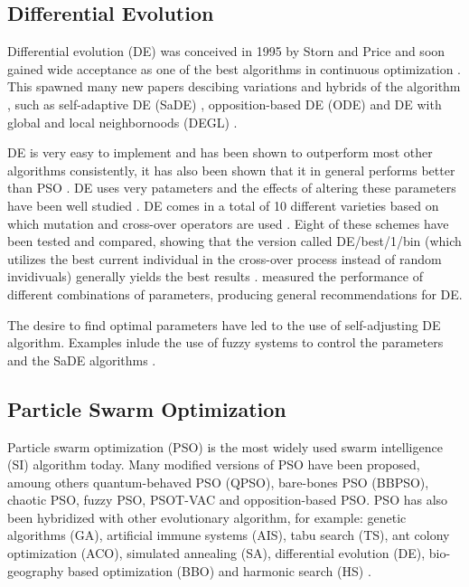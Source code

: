 \subsection{Differential Evolution}

Differential evolution (DE) was conceived in 1995 by Storn and Price \cite{storn1995differential} and soon gained wide acceptance as one of the best algorithms in continuous optimization \cite{price1997differential}. This spawned many new papers descibing variations and hybrids of the algorithm \cite{5601760}, such as self-adaptive DE (SaDE) \cite{qin2009differential}, opposition-based DE (ODE) \cite{rahnamayan2008opposition} and DE with global and local neighbornoods (DEGL) \cite{rahnamayan2008opposition}.

DE is very easy to implement and has been shown to outperform most other algorithms consistently, it has also been shown that it in general performs better than PSO \cite{das2009differential, vesterstrom2004comparative}. DE uses very patameters and the effects of altering these parameters have been well studied \cite{5601760}. DE comes in a total of 10 different varieties based on which mutation and cross-over operators are used \cite{price2006differential}. Eight of these schemes have been tested and compared, showing that the version called DE/best/1/bin (which utilizes the best current individual in the cross-over process instead of random invidivuals) generally yields the best results \cite{mezura2006comparative}. \cite{gamperle2002parameter} measured the performance of different combinations of parameters, producing general recommendations for DE.

The desire to find optimal parameters have led to the use of self-adjusting DE algorithm. Examples inlude the use of fuzzy systems to control the parameters \cite{liu2005fuzzy} and the SaDE algorithms \cite{qin2009differential}.

\subsection{Particle Swarm Optimization}

Particle swarm optimization (PSO) is the most widely used swarm intelligence (SI) algorithm today. Many modified versions of PSO have been proposed, amoung others quantum-behaved PSO (QPSO), bare-bones PSO (BBPSO), chaotic PSO, fuzzy PSO, PSOT-VAC and opposition-based PSO. PSO has also been hybridized with other evolutionary algorithm, for example: genetic algorithms (GA), artificial immune systems (AIS), tabu search (TS), ant colony optimization (ACO), simulated annealing (SA), differential evolution (DE), bio-geography based optimization (BBO) and harmonic search (HS) \cite{zhang2015comprehensive}.

